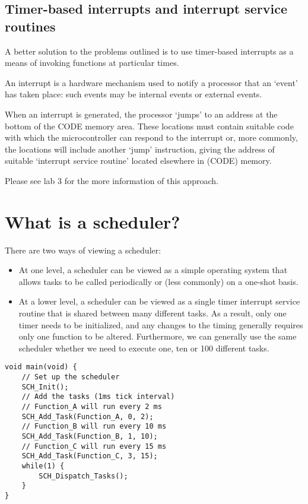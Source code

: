 \subsection{Timer-based interrupts and interrupt service routines}
A better solution to the problems outlined is to use timer-based interrupts as a means
of invoking functions at particular times.

An interrupt is a hardware mechanism used to notify a processor that an ‘event’ has taken place: such events may be internal events or external events.


When an interrupt is generated, the processor ‘jumps’ to an address at the bottom
of the CODE memory area. These locations must contain suitable code with which
the microcontroller can respond to the interrupt or, more commonly, the locations
will include another ‘jump’ instruction, giving the address of suitable ‘interrupt service routine’ located elsewhere in (CODE) memory.

Please see lab 3 for the more information of this approach. 

\section{What is a scheduler?}
There are two ways of viewing a scheduler:
\begin{itemize}
    \item  At one level, a scheduler can be viewed as a simple operating system that allows
tasks to be called periodically or (less commonly) on a one-shot basis.  
    \item  At a lower level, a scheduler can be viewed as a single timer interrupt service routine that is shared between many different tasks. As a result, only one timer needs to be  initialized, and any changes to the timing generally requires only one function to be altered. Furthermore, we can generally use the same scheduler whether we need to execute one, ten or 100 different tasks. 

\end{itemize}
\begin{lstlisting}[caption=Example of how a scheduler uses]
void main(void) {
    // Set up the scheduler
    SCH_Init();
    // Add the tasks (1ms tick interval)
    // Function_A will run every 2 ms
    SCH_Add_Task(Function_A, 0, 2);
    // Function_B will run every 10 ms
    SCH_Add_Task(Function_B, 1, 10);
    // Function_C will run every 15 ms
    SCH_Add_Task(Function_C, 3, 15);
    while(1) {
        SCH_Dispatch_Tasks();
    } 
}
\end{lstlisting}

